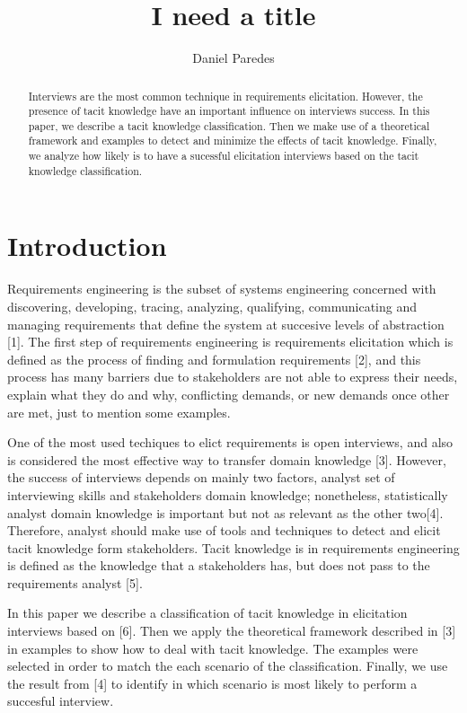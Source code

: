 \documentclass[]{llncs}
\institute{FH Dortmund, \\ \texttt{}}
\title{I need a title}
\author{Daniel Paredes}
\date{}
\begin{document}
\maketitle
\begin{abstract}
Interviews are the most common technique in requirements elicitation.
However, the presence of tacit knowledge have an important influence on
interviews success. In this paper, we describe a tacit knowledge
classification. Then we make use of a theoretical framework and examples
to detect and minimize the effects of tacit knowledge. Finally, we
analyze how likely is to have a sucessful elicitation interviews based
on the tacit knowledge classification.


\end{abstract}

\hypertarget{introduction}{%
\section{Introduction}\label{introduction}}

Requirements engineering is the subset of systems engineering concerned
with discovering, developing, tracing, analyzing, qualifying,
communicating and managing requirements that define the system at
succesive levels of abstraction {[}1{]}. The first step of requirements
engineering is requirements elicitation which is defined as the process
of finding and formulation requirements {[}2{]}, and this process has
many barriers due to stakeholders are not able to express their needs,
explain what they do and why, conflicting demands, or new demands once
other are met, just to mention some examples.

One of the most used techiques to elict requirements is open interviews,
and also is considered the most effective way to transfer domain
knowledge {[}3{]}. However, the success of interviews depends on mainly
two factors, analyst set of interviewing skills and stakeholders domain
knowledge; nonetheless, statistically analyst domain knowledge is
important but not as relevant as the other two{[}4{]}. Therefore,
analyst should make use of tools and techniques to detect and elicit
tacit knowledge form stakeholders. Tacit knowledge is in requirements
engineering is defined as the knowledge that a stakeholders has, but
does not pass to the requirements analyst {[}5{]}.

In this paper we describe a classification of tacit knowledge in
elicitation interviews based on {[}6{]}. Then we apply the theoretical
framework described in {[}3{]} in examples to show how to deal with
tacit knowledge. The examples were selected in order to match the each
scenario of the classification. Finally, we use the result from {[}4{]}
to identify in which scenario is most likely to perform a succesful
interview.
\end{document}
